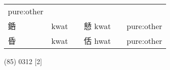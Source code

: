 \documentclass[14pt,a4paper]{scrartcl}
\begin{document}
\begin{longtable}[c]{@{}llllll@{}}
\begin{minipage}[t]{0.14\columnwidth}
pure:other
\strut\end{minipage}\tabularnewline
\begin{minipage}[t]{0.14\columnwidth}\raggedright\strut
銽
\strut\end{minipage} &
\begin{minipage}[t]{0.14\columnwidth}\raggedright\strut
kwat
\strut\end{minipage} &
\begin{minipage}[t]{0.14\columnwidth}\raggedright\strut
\strut\end{minipage} &
\begin{minipage}[t]{0.14\columnwidth}\raggedright\strut
懖 kwat
\strut\end{minipage} &
\begin{minipage}[t]{0.14\columnwidth}\raggedright\strut
\strut\end{minipage} &
\begin{minipage}[t]{0.14\columnwidth}\raggedright\strut
pure:other
\strut\end{minipage}\tabularnewline
\begin{minipage}[t]{0.14\columnwidth}\raggedright\strut
昏
\strut\end{minipage} &
\begin{minipage}[t]{0.14\columnwidth}\raggedright\strut
kwat
\strut\end{minipage} &
\begin{minipage}[t]{0.14\columnwidth}\raggedright\strut
\strut\end{minipage} &
\begin{minipage}[t]{0.14\columnwidth}\raggedright\strut
佸 hwat
\strut\end{minipage} &
\begin{minipage}[t]{0.14\columnwidth}\raggedright\strut
\strut\end{minipage} &
\begin{minipage}[t]{0.14\columnwidth}\raggedright\strut
pure:other
\strut\end{minipage}\tabularnewline
\bottomrule
\end{longtable}

(85) 0312 {[}2{]}
\end{document}
